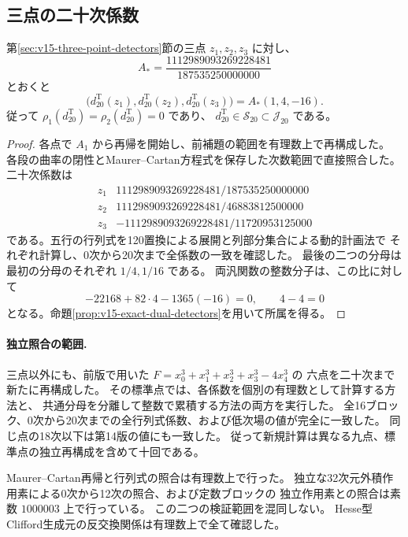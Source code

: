 \subsection{三点の二十次係数}

\begin{proposition}[新規に再構成した三点Tate値]
\label{prop:v15-fresh-tate-twentieth}
第\ref{sec:v15-three-point-detectors}節の三点 $z_1,z_2,z_3$ に対し、
\[
 A_*=\frac{1112989093269228481}{187535250000000}
\]
とおくと
\[
 \boxed{\bigl(d_{20}^{\mathrm T}(z_1),d_{20}^{\mathrm T}(z_2),
                       d_{20}^{\mathrm T}(z_3)\bigr)
          =A_*(1,4,-16).}
\]
従って $\rho_1(d_{20}^{\mathrm T})=\rho_2(d_{20}^{\mathrm T})=0$ であり、
$d_{20}^{\mathrm T}\in\mathcal S_{20}\subset\mathcal J_{20}$ である。
\end{proposition}

\begin{proof}
各点で $A_1$ から再帰を開始し、前補題の範囲を有理数上で再構成した。
各段の曲率の閉性とMaurer--Cartan方程式を保存した次数範囲で直接照合した。
二十次係数は
\[
\begin{array}{c|c}
 z_1&1112989093269228481/187535250000000\\
 z_2&1112989093269228481/46883812500000\\
 z_3&-1112989093269228481/11720953125000
\end{array}
\]
である。五行の行列式を120置換による展開と列部分集合による動的計画法で
それぞれ計算し、0次から20次まで全係数の一致を確認した。
最後の二つの分母は最初の分母のそれぞれ $1/4,1/16$ である。
両汎関数の整数分子は、この比に対して
\[
 -22168+82\cdot4-1365(-16)=0,\qquad4-4=0
\]
となる。命題\ref{prop:v15-exact-dual-detectors}を用いて所属を得る。
\end{proof}

\paragraph{独立照合の範囲.}
三点以外にも、前版で用いた $F=x_0^3+x_1^3+x_2^3+x_3^3-4x_4^3$ の
六点を二十次まで新たに再構成した。
その標準点では、各係数を個別の有理数として計算する方法と、
共通分母を分離して整数で累積する方法の両方を実行した。
全16ブロック、0次から20次までの全行列式係数、および低次場の値が完全に一致した。
同じ点の18次以下は第14版の値にも一致した。
従って新規計算は異なる九点、標準点の独立再構成を含めて十回である。

Maurer--Cartan再帰と行列式の照合は有理数上で行った。
独立な32次元外積作用素による0次から12次の照合、および定数ブロックの
独立作用素との照合は素数 $1000003$ 上で行っている。
この二つの検証範囲を混同しない。
Hesse型Clifford生成元の反交換関係は有理数上で全て確認した。


